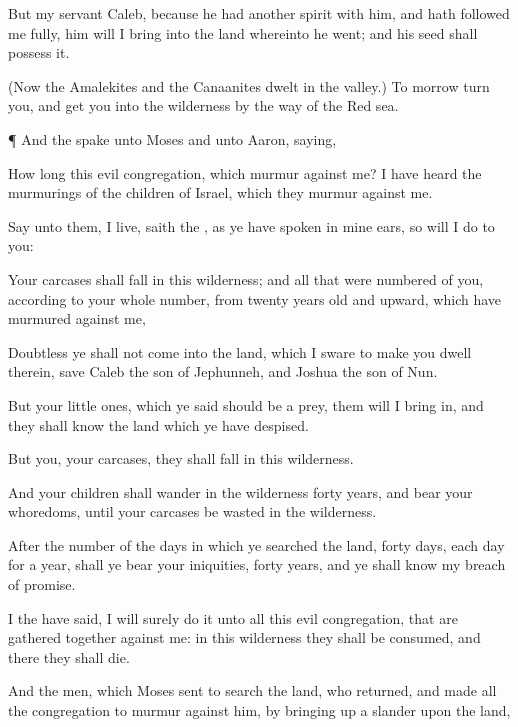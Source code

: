 {But my
servant
Caleb,
because he had
another
spirit with him, and hath
followed me
fully, him will I
bring into the
land whereinto he
went; and his
seed shall
possess it.

(Now the
Amalekites and the
Canaanites
dwelt in the
valley.) To
morrow
turn you, and
get you into the
wilderness by the
way of the
Red
sea.


\par }{\PP {}¶ And the
{}
spake unto
Moses and unto
Aaron,
saying,

How long
{} this
evil
congregation, which
murmur against me? I have
heard the
murmurings of the
children of
Israel, which they
murmur against me.

Say unto them,
{} I
live,
saith the
{}, as ye have
spoken in mine
ears, so will I
do to you:

Your
carcases shall
fall in this
wilderness; and all that were
numbered of you, according to your whole
number, from
twenty
years
old and
upward, which have
murmured against me,

Doubtless ye shall
not
come into the
land,
{} which I
sware to make you
dwell therein, save
Caleb the
son of
Jephunneh, and
Joshua the
son of
Nun.

But your little
ones, which ye
said should be a
prey, them will I bring
in, and they shall
know the
land which ye have
despised.

But
{} you, your
carcases, they shall
fall in this
wilderness.

And your
children shall
wander in the
wilderness
forty
years, and
bear your
whoredoms, until your
carcases be
wasted in the
wilderness.

After the
number of the
days in which ye
searched the
land,
{}
forty
days, each
day for a
year, shall ye
bear your
iniquities,
{}
forty
years, and ye shall
know my breach of
promise.

I the
{} have
said, I will
surely
do
it unto all this
evil
congregation, that are gathered
together against me: in this
wilderness they shall be
consumed, and there they shall
die.


\par }{\PP {}And the
men, which
Moses
sent to
search the
land, who
returned, and made all the
congregation to
murmur against him, by bringing
up a
slander upon the
land,

}
